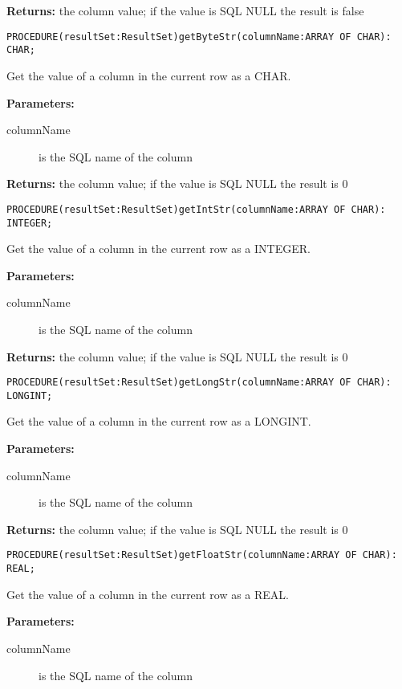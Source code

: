      {\bf Returns: } 
          the column value; if the value is SQL NULL the result is false 


\verb'PROCEDURE(resultSet:ResultSet)getByteStr(columnName:ARRAY OF CHAR): CHAR;'

     Get the value of a column in the current row as a CHAR. 

     {\bf Parameters: } 
\begin{description}
\item[columnName] is the SQL name of the column 
\end{description}

     {\bf Returns: } 
          the column value; if the value is SQL NULL the result is 0 


\verb'PROCEDURE(resultSet:ResultSet)getIntStr(columnName:ARRAY OF CHAR): INTEGER;'

     Get the value of a column in the current row as a INTEGER. 

     {\bf Parameters: } 
\begin{description}
\item[columnName] is the SQL name of the column 
\end{description}

     {\bf Returns: } 
          the column value; if the value is SQL NULL the result is 0 


\verb'PROCEDURE(resultSet:ResultSet)getLongStr(columnName:ARRAY OF CHAR): LONGINT;'

     Get the value of a column in the current row as a LONGINT. 

     {\bf Parameters: } 
\begin{description}
\item[columnName] is the SQL name of the column 
\end{description}

     {\bf Returns: } 
          the column value; if the value is SQL NULL the result is 0 


\verb'PROCEDURE(resultSet:ResultSet)getFloatStr(columnName:ARRAY OF CHAR): REAL;'

     Get the value of a column in the current row as a REAL. 

     {\bf Parameters: } 
\begin{description}
\item[columnName] is the SQL name of the column 
\end{description}

